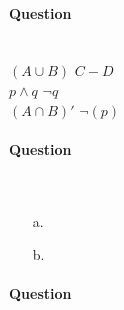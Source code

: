 \documentclass[a4paper,12pt]{book} \usepackage[utf8]{inputenc} \title{} \author{Rachel Morris} \date{\today}
\newcounter{answer}
\begin{document}
    \paragraph{Question \theanswer}

        ~\\
        $(A \cup B)$                      \tab[2cm]
        $C - D$                        \\
        $p \land q$                     \tab[3cm]
        $\neg q$                               \\
        $(A \cap B)'$                \tab[2cm]
        $\neg(p)$                   


    \paragraph{Question \theanswer} ~\\

        \begin{enumerate}
            \item[a.]

            \item[b.]
        \end{enumerate}

\newpage
    \paragraph{Question \theanswer} ~\\
\end{document}
